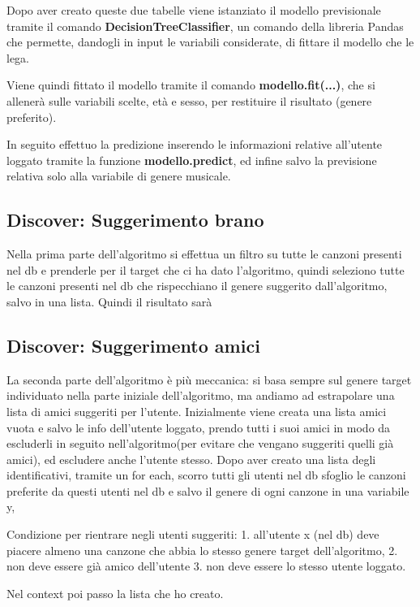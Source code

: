 Dopo aver creato queste due tabelle viene istanziato il modello previsionale tramite il comando \textbf{DecisionTreeClassifier}, un comando 
della libreria Pandas che permette, dandogli in input le variabili considerate, di fittare il modello che le lega. 

Viene quindi fittato il modello tramite il comando \textbf{modello.fit(...)}, che si allenerà sulle variabili scelte, età e sesso, per restituire 
il risultato (genere preferito). 

In seguito effettuo la predizione inserendo le informazioni relative all'utente loggato tramite la funzione \textbf{modello.predict}, ed infine 
salvo la previsione relativa solo alla variabile di genere musicale. 



\subsection{Discover: Suggerimento brano}
Nella prima parte dell'algoritmo si effettua un filtro su tutte le canzoni presenti nel db e 
prenderle per il target che ci ha dato l'algoritmo, quindi seleziono tutte le canzoni presenti nel db che 
rispecchiano il genere suggerito dall'algoritmo, salvo in una lista. 
Quindi il risultato sarà

\subsection{Discover: Suggerimento amici}
La seconda parte dell'algoritmo è più meccanica: si basa sempre sul genere target individuato nella parte
iniziale dell'algoritmo, ma andiamo ad estrapolare una lista di amici suggeriti per l'utente. 
Inizialmente viene creata una lista amici vuota e salvo le info dell'utente loggato, prendo tutti 
i suoi amici in modo da escluderli in seguito nell'algoritmo(per evitare che vengano suggeriti quelli già amici), ed escludere
anche l'utente stesso. Dopo aver creato una lista degli identificativi, tramite un for each, scorro tutti gli utenti nel db
sfoglio le canzoni preferite da questi utenti nel db e salvo il genere di ogni canzone in una variabile y, 

Condizione per rientrare negli utenti suggeriti:
1. all'utente x (nel db) deve piacere almeno una canzone che abbia lo stesso genere target dell'algoritmo, 
2. non deve essere già amico dell'utente
3. non deve essere lo stesso utente loggato. 

Nel context poi passo la lista che ho creato. 

